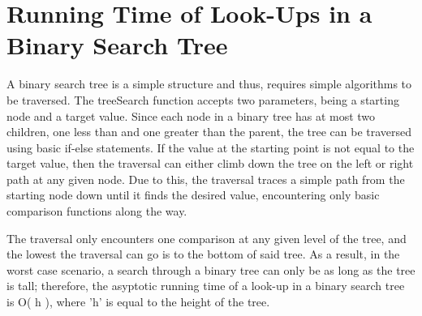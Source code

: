 \documentclass[letterpaper, 10pt]{article}
\begin{document}
\section{Running Time of Look-Ups in a Binary Search Tree}\par

A binary search tree is a simple structure and thus, requires simple algorithms to be traversed. The treeSearch function accepts two parameters, being a starting node and a target value. Since each node in a binary tree has at most two children, one less than and one greater than the parent, the tree can be traversed using basic if-else statements. If the value at the starting point is not equal to the target value, then the traversal can either climb down the tree on the left or right path at any given node. Due to this, the traversal traces a simple path from the starting node down until it finds the desired value, encountering only basic comparison functions along the way.\par
The traversal only encounters one comparison at any given level of the tree, and the lowest the traversal can go is to the bottom of said tree. As a result, in the worst case scenario, a search through a binary tree can only be as long as the tree is tall; therefore, the asyptotic running time of a look-up in a binary search tree is O( h ), where 'h' is equal to the height of the tree.\par
\end{document}
